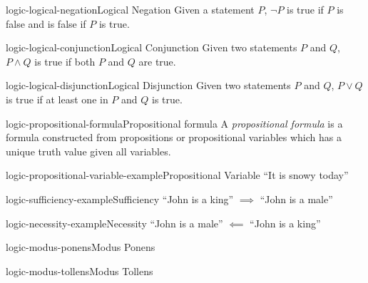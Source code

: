 \documentclass[preview]{standalone}
\begin{document}
\begin{snippetdefinition}{logic-logical-negation}{Logical Negation}{
    Given a statement \(P\), \(\lnot P\) is true if \(P\) is false
    and is false if \(P\) is true.
}
\end{snippetdefinition}

\begin{snippetdefinition}{logic-logical-conjunction}{Logical Conjunction}{
    Given two statements \(P\) and \(Q\), \(P \land Q\) is true if both \(P\) and \(Q\) are true.
}
\end{snippetdefinition}

\begin{snippetdefinition}{logic-logical-disjunction}{Logical Disjunction}{
    Given two statements \(P\) and \(Q\), \(P \lor Q\) is true if at least one in \(P\) and \(Q\) is true.
}
\end{snippetdefinition}

\begin{snippetdefinition}{logic-propositional-formula}{Propositional formula}{
    A \textit{propositional formula} is a formula constructed from propositions or
    propositional variables which has a unique truth value given all variables.
}
\end{snippetdefinition}

\begin{snippetexample}{logic-propositional-variable-example}{Propositional Variable}{
    ``It is snowy today''
}
\end{snippetexample}

\begin{snippetexample}{logic-sufficiency-example}{Sufficiency}{
    ``John is a king'' \(\implies\) ``John is a male''
}
\end{snippetexample}

\begin{snippetexample}{logic-necessity-example}{Necessity}{
    ``John is a male'' \(\impliedby\) ``John is a king''
}
\end{snippetexample}

\begin{snippetdefinition}{logic-modus-ponens}{Modus Ponens}
    \begin{prooftree}
    \end{prooftree}
\end{snippetdefinition}

\begin{snippetdefinition}{logic-modus-tollens}{Modus Tollens}
    \begin{prooftree}
    \end{prooftree}
\end{snippetdefinition}
\end{document}
